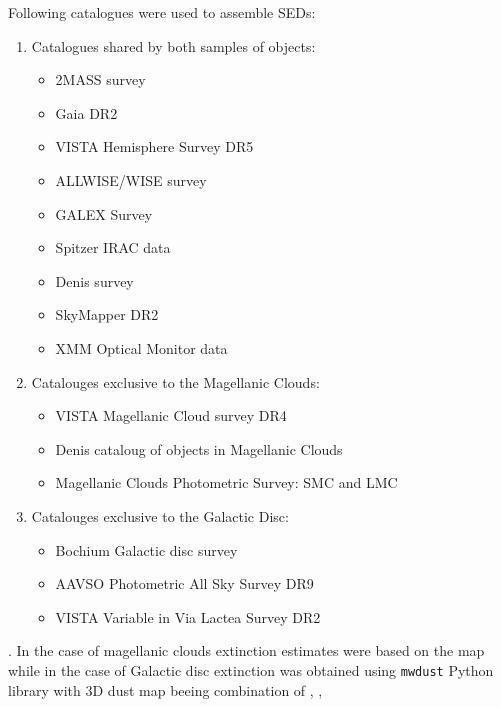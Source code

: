 \documentclass{pracalicmgr}
\begin{document}
Following catalogues were used to assemble SEDs:
\begin{enumerate}
\item Catalogues shared by both samples of objects:
\begin{itemize}
    \item 2MASS survey \citep{skrutskie_two_2006}
    \item Gaia DR2 \citep{gaia_collaboration_gaia_2018}
    \item VISTA Hemisphere Survey DR5 \citep{mcmahon_vizier_2021}
    \item ALLWISE/WISE survey \citep{wright_wide-field_2010} \citep{cutri_vizier_2021}
    \item GALEX Survey \citep{bianchi_galex_2011}
    \item Spitzer IRAC data \citep{meixner_spitzer_2006}
    \item Denis survey  \citep{denis_vizier_2005}
    \item SkyMapper DR2 \citep{wolf_skymapper_2018} \citep{onken_skymapper_2019}
    \item XMM Optical Monitor data \citep{page_xmm-newton_2012}
\end{itemize}
\item Catalouges exclusive to the Magellanic Clouds:
\begin{itemize}
    \item VISTA Magellanic Cloud survey DR4 \citep{cioni_vizier_2017}
    \item Denis cataloug of objects in Magellanic Clouds \citep{cioni_denis_2000}
    \item Magellanic Clouds Photometric Survey: SMC and LMC \citep{zaritsky_magellanic_2002} \citep{zaritsky_magellanic_2004}
\end{itemize}
\item Catalouges exclusive to the Galactic Disc:
\begin{itemize}
    \item Bochium Galactic disc survey \citep{hackstein_bochum_2015}
    \item AAVSO Photometric All Sky Survey DR9 \citep{henden_apass_2015}
    \item VISTA Variable in Via Lactea Survey DR2 \citep{minniti_vizier_2017}
\end{itemize} 
\end{enumerate}. In the case of magellanic clouds extinction estimates were based on the map \citep{skowron_ogle-ing_2021} while in the case of Galactic disc extinction
was obtained using \texttt{mwdust} \citep{bovy_galactic_2016} Python library with 3D dust map beeing combination of \citep{green_3d_2019}, \citep{greiner_unusually_2001},
\end{document}
